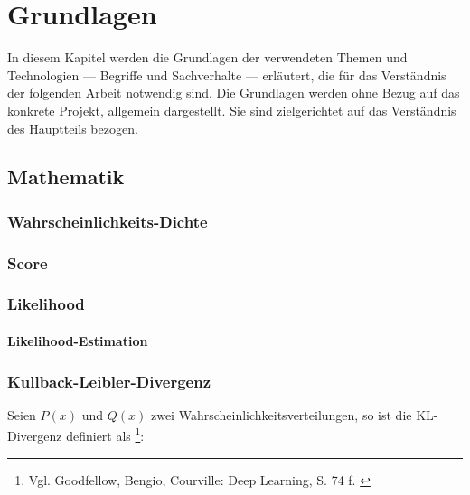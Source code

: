 \chapter{Grundlagen}

In diesem Kapitel werden die Grundlagen der verwendeten Themen und Technologien --- Begriffe und Sachverhalte --- erläutert, die für das Verständnis der folgenden Arbeit notwendig sind.
Die Grundlagen werden ohne Bezug auf das konkrete Projekt, allgemein dargestellt. Sie sind zielgerichtet auf das Verständnis des Hauptteils bezogen.



\section{Mathematik}

\subsection{Wahrscheinlichkeits-Dichte}

\subsection{Score}

\subsection{Likelihood}

\subsubsection{Likelihood-Estimation}

\subsection{Kullback-Leibler-Divergenz}

Seien $P(x)$ und $Q(x)$ zwei Wahrscheinlichkeitsverteilungen, so ist die KL-Divergenz definiert als \footnote{
    Vgl. Goodfellow, Bengio, Courville: Deep Learning, S. 74 f.
    \cite{Goodfellow-et-al-2016}
}:


